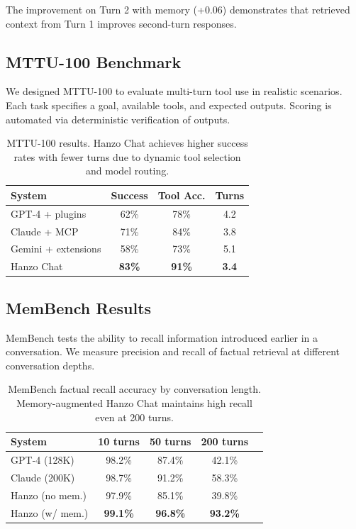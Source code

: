 The improvement on Turn 2 with memory (+0.06) demonstrates that retrieved context from Turn 1 improves second-turn responses.

\subsection{MTTU-100 Benchmark}

We designed MTTU-100 to evaluate multi-turn tool use in realistic scenarios. Each task specifies a goal, available tools, and expected outputs. Scoring is automated via deterministic verification of outputs.

\begin{table}[H]
\centering
\small
\begin{tabular}{lccc}
\toprule
\textbf{System} & \textbf{Success} & \textbf{Tool Acc.} & \textbf{Turns} \\
\midrule
GPT-4 + plugins & 62\% & 78\% & 4.2 \\
Claude + MCP & 71\% & 84\% & 3.8 \\
Gemini + extensions & 58\% & 73\% & 5.1 \\
Hanzo Chat & \textbf{83\%} & \textbf{91\%} & \textbf{3.4} \\
\bottomrule
\end{tabular}
\caption{MTTU-100 results. Hanzo Chat achieves higher success rates with fewer turns due to dynamic tool selection and model routing.}
\label{tab:mttu}
\end{table}

\subsection{MemBench Results}

MemBench tests the ability to recall information introduced earlier in a conversation. We measure precision and recall of factual retrieval at different conversation depths.

\begin{table}[H]
\centering
\small
\begin{tabular}{lcccc}
\toprule
\textbf{System} & \textbf{10 turns} & \textbf{50 turns} & \textbf{200 turns} \\
\midrule
GPT-4 (128K) & 98.2\% & 87.4\% & 42.1\% \\
Claude (200K) & 98.7\% & 91.2\% & 58.3\% \\
Hanzo (no mem.) & 97.9\% & 85.1\% & 39.8\% \\
Hanzo (w/ mem.) & \textbf{99.1\%} & \textbf{96.8\%} & \textbf{93.2\%} \\
\bottomrule
\end{tabular}
\caption{MemBench factual recall accuracy by conversation length. Memory-augmented Hanzo Chat maintains high recall even at 200 turns.}
\label{tab:membench}
\end{table}


